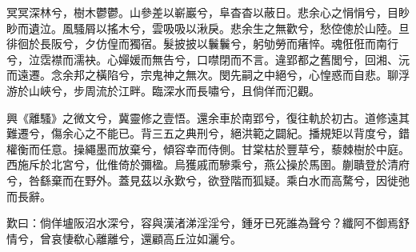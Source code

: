 
\begin{pinyinscope}
冥冥深林兮，樹木鬱鬱。山參差以嶄巖兮，阜杳杳以蔽日。悲余心之悁悁兮，目眇眇而遺泣。風騷屑以搖木兮，雲吸吸以湫戾。悲余生之無歡兮，愁倥傯於山陸。旦徘徊於長阪兮，夕仿偟而獨宿。髮披披以鬤鬤兮，躬劬勞而瘏悴。魂俇俇而南行兮，泣霑襟而濡袂。心嬋媛而無告兮，口噤閉而不言。違郢都之舊閭兮，回湘、沅而遠遷。念余邦之橫陷兮，宗鬼神之無次。閔先嗣之中絕兮，心惶惑而自悲。聊浮游於山峽兮，步周流於江畔。臨深水而長嘯兮，且倘佯而氾觀。

興《離騷》之微文兮，冀靈修之壹悟。還余車於南郢兮，復往軌於初古。道修遠其難遷兮，傷余心之不能已。背三五之典刑兮，絕洪範之闢紀。播規矩以背度兮，錯權衡而任意。操繩墨而放棄兮，傾容幸而侍側。甘棠枯於豐草兮，藜棘樹於中庭。西施斥於北宮兮，仳倠倚於彌楹。烏獲戚而驂乘兮，燕公操於馬圉。蒯聵登於清府兮，咎繇棄而在野外。蓋見茲以永歎兮，欲登階而狐疑。乘白水而高騖兮，因徙弛而長辭。

歎曰：倘佯壚阪沼水深兮，容與漢渚涕淫淫兮，鍾牙已死誰為聲兮？纖阿不御焉舒情兮，曾哀悽欷心離離兮，還顧高丘泣如灑兮。


\end{pinyinscope}